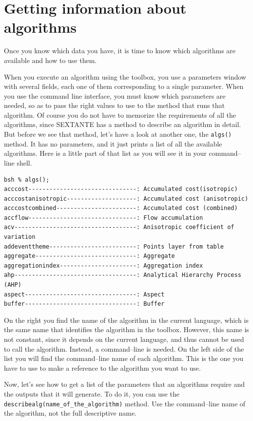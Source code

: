 \section{Getting information about algorithms}

Once you know which data you have, it is time to know which algorithms are available and how to use them. 

When you execute an algorithm using the toolbox, you use a parameters window with several fields, each one of them corresponding to a single parameter. When you use the command line interface, you must know which parameters are needed, so as to pass the right values to use to the method that runs that algorithm. Of course you do not have to memorize the requirements of all the algorithms, since SEXTANTE has a method to describe an algorithm in detail. But before we see that method, let's have a look at another one, the \texttt{algs()} method. It has no parameters, and it just prints a list of all the available algorithms. Here is a little part of that list as you will see it in your command--line shell.

\begin{verbatim}
bsh % algs();
acccost-------------------------------: Accumulated cost(isotropic)
acccostanisotropic--------------------: Accumulated cost (anisotropic)
acccostcombined-----------------------: Accumulated cost (combined)
accflow-------------------------------: Flow accumulation
acv-----------------------------------: Anisotropic coefficient of variation
addeventtheme-------------------------: Points layer from table
aggregate-----------------------------: Aggregate
aggregationindex----------------------: Aggregation index
ahp-----------------------------------: Analytical Hierarchy Process (AHP)
aspect--------------------------------: Aspect
buffer--------------------------------: Buffer
\end{verbatim}


On the right you find the name of the algorithm in the current language, which is the same name that identifies the algorithm in the toolbox. However, this name is not constant, since it depends on the current language, and thus cannot be used to call the algorithm. Instead, a command--line is needed. On the left side of the list you will find the command--line name of each algorithm. This is the one you have to use to make a reference to the algorithm you want to use.

Now, let's see how to get a list of the parameters that an algorithms require and the outputs that it will generate. To do it, you can use the \texttt{describealg(name\_of\_the\_algorithm)} method. Use the command--line name of the algorithm, not the full descriptive name.

